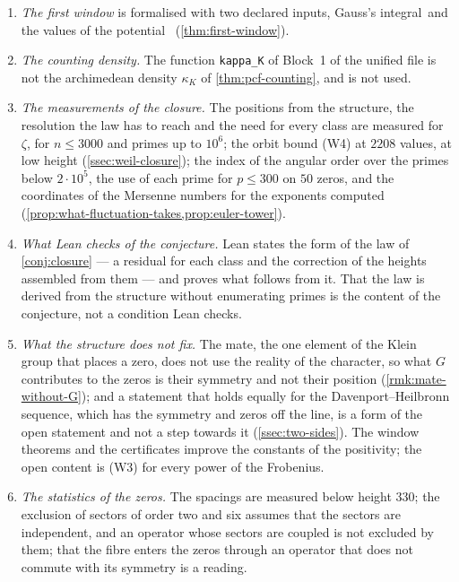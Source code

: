 \begin{enumerate}
    Lehmann matrices are computed in double precision (\cref{ssec:golden-field}).
  \item \emph{The first window} is formalised with two declared inputs, Gauss's
    integral\ and the values of the potential \ (\cref{thm:first-window}).
  \item \emph{The counting density.}  The function
    \texttt{kappa\_K} of Block~1 of the unified file is not the archimedean density $\kappa_K$ of \cref{thm:pcf-counting}, and is not used.
  \item \emph{The measurements of the closure.}  The positions from the structure, the
    resolution the law has to reach and the need for every class are measured for $\zeta$, for $n\le3000$ and primes up to $10^6$; the orbit bound (W4) at $2208$ values, at low
    height (\cref{ssec:weil-closure}); the index of the angular order over the primes below $2\cdot10^5$, the
    use of each prime for $p\le300$ on $50$ zeros, and the coordinates of the Mersenne numbers for the
    exponents computed (\cref{prop:what-fluctuation-takes,prop:euler-tower}).
  \item \emph{What Lean checks of the conjecture.}  Lean states the form of the law of
    \cref{conj:closure} --- a residual for each class and the correction of the heights assembled from them --- and proves
    what follows from it.  That the law is derived from the structure without
    enumerating primes is the content of the conjecture, not a condition Lean checks.
  \item \emph{What the structure does not fix.}  The mate, the one element of the Klein group that places a zero,
    does not use the reality of the character, so what $G$ contributes to the zeros is their symmetry and not
    their position (\cref{rmk:mate-without-G}); and a statement that holds equally for the Davenport--Heilbronn
    sequence, which has the symmetry and zeros off the line, is a form of the open statement and not a step towards
    it (\cref{ssec:two-sides}).  The window theorems and the certificates improve the constants of the positivity;
    the open content is (W3) for every power of the Frobenius.
  \item \emph{The statistics of the zeros.}  The spacings are measured below height $330$; the exclusion of sectors of
    order two and six assumes that the sectors are independent, and an operator whose sectors are coupled is not
    excluded by them; that the fibre enters the zeros through an operator that does not commute with its symmetry is a reading.
\end{enumerate}

